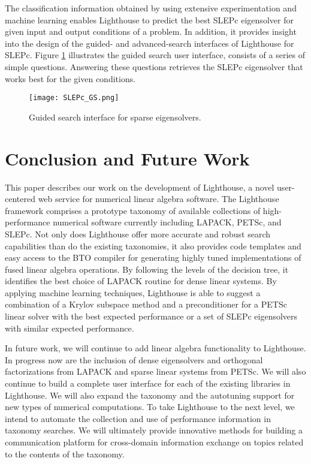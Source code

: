 \documentclass{sig-alternate}
\begin{document}
The classification information obtained by using extensive experimentation and machine learning 
enables Lighthouse to predict the best SLEPc eigensolver for given input and output conditions of
a problem. In addition, it provides insight into the design of the guided- and advanced-search interfaces of Lighthouse for SLEPc.
Figure \ref{fig:SLEPc_GS} illustrates the guided search user interface, consists of a series of simple
questions. Answering these questions retrieves the SLEPc eigensolver that works best for the given conditions.

\begin{figure}[ht]
\centering
\texttt{[image: SLEPc\_GS.png]}
\vspace{-5pt}
\caption{Guided search interface for sparse eigensolvers.}
\label{fig:SLEPc_GS}
\end{figure}


\section{Conclusion and Future Work}
\label{sec:conclusion}


This paper describes our work on the development of Lighthouse, a novel user-centered web service for numerical linear algebra software.
The Lighthouse framework comprises a prototype taxonomy of available collections of high-per\-formance 
numerical software currently including LAPACK, PETSc, and SLEPc.
Not only does Lighthouse offer more accurate and robust search capabilities than do the existing taxonomies, it also provides code templates and
easy access to the BTO compiler for generating highly tuned implementations of fused linear algebra operations.  By following
the levels of the decision tree, it identifies the best choice of LAPACK routine for dense linear systems. By applying machine learning techniques,
Lighthouse is able to suggest a combination of a Krylov subspace method and a preconditioner for a PETSc linear solver with the best expected
performance or a
set of SLEPc eigensolvers with similar expected performance.

In future work, we will continue to add linear algebra functionality to Lighthouse.  In progress now are the inclusion of
dense eigensolvers and orthogonal factorizations from LAPACK and sparse linear systems from PETSc.
We will also
 continue to build a complete user interface for each of the existing libraries in Lighthouse. We will also 
expand the taxonomy and the autotuning support for new types of numerical computations. 
To take Lighthouse to the next level, we intend to automate the collection
and use of performance information in taxonomy searches. We will ultimately provide innovative methods for building a communication platform
for cross-domain information exchange on topics related to the contents of the taxonomy.
\end{document}
